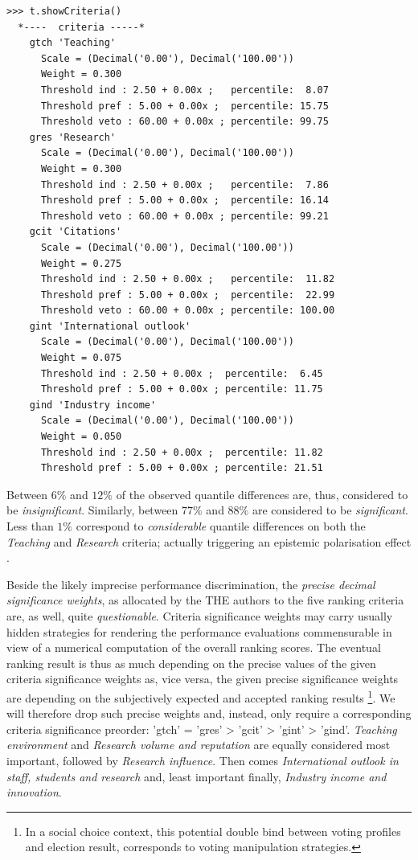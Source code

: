\begin{lstlisting}[caption={Inspecting the performance discrimination thresholds},label=list:13.6]
>>> t.showCriteria()
  *----  criteria -----*
    gtch 'Teaching'
      Scale = (Decimal('0.00'), Decimal('100.00'))
      Weight = 0.300 
      Threshold ind : 2.50 + 0.00x ;   percentile:  8.07
      Threshold pref : 5.00 + 0.00x ;  percentile: 15.75
      Threshold veto : 60.00 + 0.00x ; percentile: 99.75
    gres 'Research'
      Scale = (Decimal('0.00'), Decimal('100.00'))
      Weight = 0.300 
      Threshold ind : 2.50 + 0.00x ;   percentile:  7.86
      Threshold pref : 5.00 + 0.00x ;  percentile: 16.14
      Threshold veto : 60.00 + 0.00x ; percentile: 99.21
    gcit 'Citations'
      Scale = (Decimal('0.00'), Decimal('100.00'))
      Weight = 0.275 
      Threshold ind : 2.50 + 0.00x ;   percentile:  11.82
      Threshold pref : 5.00 + 0.00x ;  percentile:  22.99
      Threshold veto : 60.00 + 0.00x ; percentile: 100.00
    gint 'International outlook'
      Scale = (Decimal('0.00'), Decimal('100.00'))
      Weight = 0.075 
      Threshold ind : 2.50 + 0.00x ;  percentile:  6.45
      Threshold pref : 5.00 + 0.00x ; percentile: 11.75
    gind 'Industry income'
      Scale = (Decimal('0.00'), Decimal('100.00'))
      Weight = 0.050 
      Threshold ind : 2.50 + 0.00x ;  percentile: 11.82
      Threshold pref : 5.00 + 0.00x ; percentile: 21.51
\end{lstlisting}

Between $6\%$ and $12\%$ of the observed quantile differences are, thus, considered to be \emph{insignificant}. Similarly, between $77\%$ and $88\%$ are considered to be \emph{significant}. Less than $1\%$ correspond to \emph{considerable} quantile differences on both the \emph{Teaching} and \emph{Research} criteria; actually triggering an epistemic polarisation effect \citep{BIS-2013}.

Beside the likely imprecise performance discrimination, the \emph{precise decimal significance weights}, as allocated by the THE authors to the five ranking criteria are, as well, quite \emph{questionable}. Criteria significance weights may carry usually hidden strategies for rendering the performance evaluations commensurable in view of a numerical computation of the overall ranking scores. The eventual ranking result is thus as much depending on the precise values of the given criteria significance weights as, vice versa, the given precise significance weights are depending on the subjectively expected and accepted ranking results \footnote{In a social choice context, this potential double bind between voting profiles and election result, corresponds to voting manipulation strategies.}. We will therefore drop such precise weights and, instead, only require a corresponding criteria significance preorder: 'gtch' = 'gres' > 'gcit' > 'gint' > 'gind'. \emph{Teaching environment} and \emph{Research volume and reputation} are equally considered most important, followed by \emph{Research influence}. Then comes \emph{International outlook in staff, students and research} and, least important finally, \emph{Industry income and innovation}.

